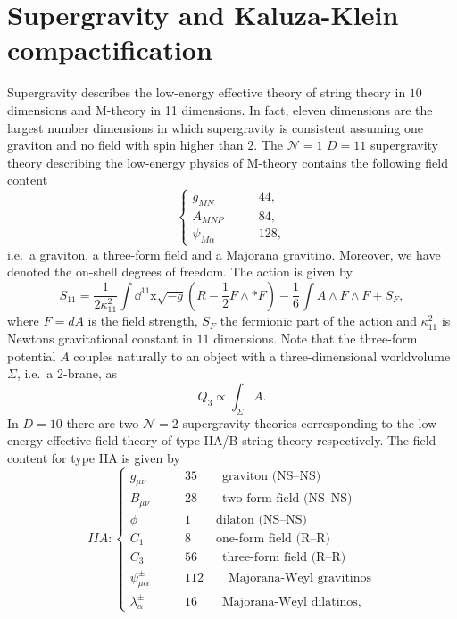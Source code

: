 \section{Supergravity and Kaluza-Klein compactification\label{sec:Supergravity}}
Supergravity describes the low-energy effective theory of string theory in $10$ dimensions and M-theory in 11 dimensions. In fact, eleven dimensions are the largest number dimensions in which supergravity is consistent assuming one graviton and no field with spin higher than $2$. The $\mathcal{N}=1$ $D=11$ supergravity theory describing the low-energy physics of M-theory contains the following field content 
\begin{equation}
    \begin{cases}
        g_{MN} \qquad &44,\\
        A_{MNP} \qquad &84,\\
        \psi_{M\alpha} \qquad &128,
    \end{cases}
\end{equation}
i.e.\ a graviton, a three-form field and a Majorana gravitino. Moreover, we have denoted the on-shell degrees of freedom. The action is given by 
\begin{equation}
    S_{11} = \frac{1}{2\kappa_{11}^2}\int\dd^{11}\mathrm{x}\sqrt{-g}\left(R-\frac{1}{2}F\wedge *F\right)-\frac{1}{6}\int A \wedge F\wedge F+S_F, 
\end{equation}
where $F=dA$ is the field strength, $S_F$ the fermionic part of the action and $\kappa_{11}^2$ is Newtons gravitational constant in $11$ dimensions. Note that the three-form potential $A$ couples naturally to an object with a three-dimensional worldvolume $\Sigma$, i.e.\ a 2-brane, as 
\begin{equation}
    Q_3 \propto \int_{\Sigma}A.
\end{equation}
In $D=10$ there are two $\mathcal{N}=2$ supergravity theories corresponding to the low-energy effective field theory of type IIA/B string theory respectively. The field content for type IIA is given by 
\begin{equation*}
    IIA: \begin{cases}
                g_{\mu\nu} \qquad &35 \qquad \text{graviton (NS--NS)}\\
                B_{\mu\nu} \qquad &28 \qquad  \text{two-form field (NS--NS)}\\
                \phi\qquad &1 \qquad  \text{dilaton (NS--NS)}\\
                C_{1}\qquad &8 \qquad  \text{one-form field (R--R)}\\
                C_{3}\qquad &56 \qquad  \text{three-form field  (R--R)}\\
                \psi_{\mu\alpha}^\pm\qquad &112\qquad \text{Majorana-Weyl gravitinos}\\
                \lambda_\alpha^\pm \qquad &16\qquad \text{Majorana-Weyl dilatinos},
          \end{cases}
\end{equation*}
